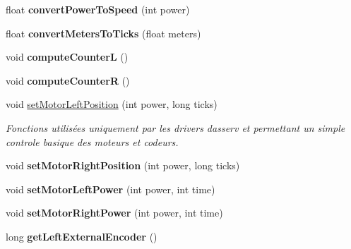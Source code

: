 \begin{DoxyCompactItemize}
\mbox{\label{classAsservDriver_a10895a322108211299951538aa2ff614}} 
float {\bfseries convert\+Power\+To\+Speed} (int power)
\item 
\mbox{\label{classAsservDriver_aa1febcc45f372e9f0f39bad03a09ebad}} 
float {\bfseries convert\+Meters\+To\+Ticks} (float meters)
\item 
\mbox{\label{classAsservDriver_a8b02e6ec0a124ca9178f17c829d48513}} 
void {\bfseries compute\+CounterL} ()
\item 
\mbox{\label{classAsservDriver_af852b42fef0dbd773141d5e5fd0a74f6}} 
void {\bfseries compute\+CounterR} ()
\item 
\mbox{\label{classAsservDriver_a49dad05da23fe62aa4bf582199eaa3a6}} 
void \hyperlink{classAsservDriver_a49dad05da23fe62aa4bf582199eaa3a6}{set\+Motor\+Left\+Position} (int power, long ticks)
\begin{DoxyCompactList}\small\item\em Fonctions utilisées uniquement par les drivers d\textquotesingle{}asserv et permettant un simple controle basique des moteurs et codeurs. \end{DoxyCompactList}\item 
\mbox{\label{classAsservDriver_a62a57e92e4933413d9c3c6b62f496ef3}} 
void {\bfseries set\+Motor\+Right\+Position} (int power, long ticks)
\item 
\mbox{\label{classAsservDriver_a3b702233fa09a657bb03372470152376}} 
void {\bfseries set\+Motor\+Left\+Power} (int power, int time)
\item 
\mbox{\label{classAsservDriver_a54e742670bae9a19dc70b982cad4c3ba}} 
void {\bfseries set\+Motor\+Right\+Power} (int power, int time)
\item 
\mbox{\label{classAsservDriver_aa6924c9da7428d59fa712c15221dfbac}} 
long {\bfseries get\+Left\+External\+Encoder} ()
\item 
\mbox{\label{classAsservDriver_afda042c513d96188f8572899679cc616}} 

\end{DoxyCompactItemize}
